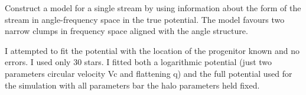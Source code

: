 Construct a model for a single stream by using information about the form of the stream in angle-frequency space in the true potential. The model favours two narrow clumps in frequency space aligned with the angle structure.

I attempted to fit the potential with the location of the progenitor known and no errors. I used only 30 stars. I fitted both a logarithmic potential (just two parameters circular velocity Vc and flattening q) and the full potential used for the simulation with all parameters bar the halo parameters held fixed.